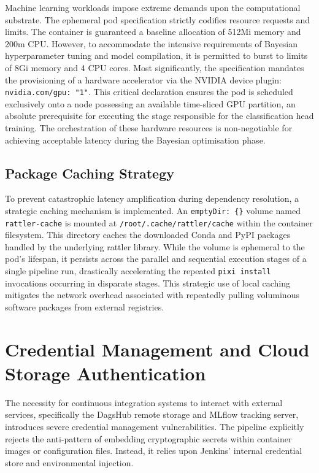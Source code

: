 Machine learning workloads impose extreme demands upon the computational substrate. The ephemeral pod specification strictly codifies resource requests and limits. The container is guaranteed a baseline allocation of 512Mi memory and 200m CPU. However, to accommodate the intensive requirements of Bayesian hyperparameter tuning and model compilation, it is permitted to burst to limits of 8Gi memory and 4 CPU cores. Most significantly, the specification mandates the provisioning of a hardware accelerator via the NVIDIA device plugin: \texttt{nvidia.com/gpu: "1"}. This critical declaration ensures the pod is scheduled exclusively onto a node possessing an available time-sliced GPU partition, an absolute prerequisite for executing the stage responsible for the classification head training. The orchestration of these hardware resources is non-negotiable for achieving acceptable latency during the Bayesian optimisation phase.

\subsection{Package Caching Strategy}

To prevent catastrophic latency amplification during dependency resolution, a strategic caching mechanism is implemented. An \texttt{emptyDir: \{\}} volume named \texttt{rattler-cache} is mounted at \texttt{/root/.cache/rattler/cache} within the container filesystem. This directory caches the downloaded Conda and PyPI packages handled by the underlying rattler library. While the volume is ephemeral to the pod's lifespan, it persists across the parallel and sequential execution stages of a single pipeline run, drastically accelerating the repeated \texttt{pixi install} invocations occurring in disparate stages. This strategic use of local caching mitigates the network overhead associated with repeatedly pulling voluminous software packages from external registries.

\section{Credential Management and Cloud Storage Authentication}
\label{sec:credential_management}

The necessity for continuous integration systems to interact with external services, specifically the DagsHub remote storage and MLflow tracking server, introduces severe credential management vulnerabilities. The pipeline explicitly rejects the anti-pattern of embedding cryptographic secrets within container images or configuration files. Instead, it relies upon Jenkins' internal credential store and environmental injection.

